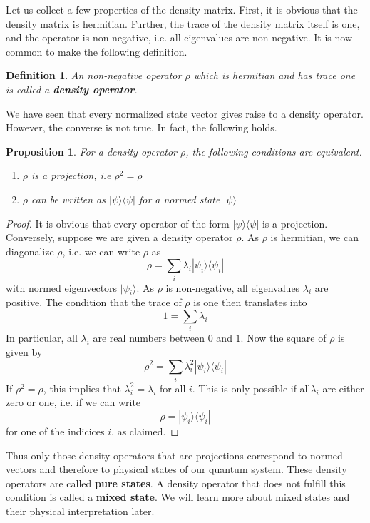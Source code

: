 \documentclass[a4paper, draft]{article}
\theoremstyle{own}
\newtheorem{prop}[thm]{Proposition}
\newtheorem{defn}{Definition}[section]
\theoremstyle{remark}
\begin{document}
Let us collect a few properties of the density matrix. First, it is obvious that the density matrix is hermitian. Further, the trace of the density matrix itself is one, and the operator is non-negative, i.e. all eigenvalues are non-negative. It is now common to make the following definition.

\begin{defn}
An non-negative operator $\rho$ which is hermitian and has trace one is called a {\bf density operator}.
\end{defn}

We have seen that every normalized state vector gives raise to a density operator. However, the converse is not true. In fact, the following holds.

\begin{prop}
For a density operator $\rho$, the following conditions are equivalent.
\begin{enumerate}
	\item $\rho$ is a projection, i.e $\rho^2 = \rho$
	\item $\rho$ can be written as $|\psi \rangle \langle \psi |$ for a normed state $|\psi \rangle$	
\end{enumerate}
\end{prop}

\begin{proof}
It is obvious that every operator of the form $|\psi \rangle \langle \psi |$ is a projection. Conversely, suppose we are given a density operator $\rho$. As $\rho$ is hermitian, we can diagonalize $\rho$, i.e. we can write $\rho$ as
$$
\rho = \sum_i \lambda_i |\psi_i \rangle \langle \psi_i |
$$
with normed eigenvectors $|\psi_i \rangle$. As $\rho$ is non-negative, all eigenvalues $\lambda_i$ are positive. The condition that the trace of $\rho$ is one then translates into
$$
1 = \sum_i \lambda_i
$$
In particular, all $\lambda_i$ are real numbers between $0$ and $1$. Now the square of $\rho$ is given by
$$
\rho^2 = \sum_i \lambda_i^2 |\psi_i \rangle \langle \psi_i |
$$
If $\rho^2 = \rho$, this implies that $\lambda_i^2 = \lambda_i$ for all $i$. This is only possible if all$ \lambda_i$ are either zero or one, i.e. if we can write
$$
\rho = |\psi_i \rangle \langle \psi_i |
$$
for one of the indicices $i$, as claimed.
\end{proof}

Thus only those density operators that are projections correspond to normed vectors and therefore to physical states of our quantum system. These density operators are called {\bf pure states}. A density operator that does not fulfill this condition is called a {\bf mixed state}. We will learn more about mixed states and their physical interpretation later.
\end{document}
